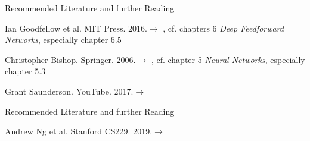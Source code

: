 \begin{frame}{Recommended Literature and further Reading}{}
	\footnotesize
	\begin{thebibliography}{2}
			{Ian Goodfellow et al. MIT Press. 2016.}{$\rightarrow$ \href{
				http://www.deeplearningbook.org/
			}{}, cf. chapters 6 \textit{Deep Feedforward Networks}, especially chapter 6.5}
	
			{Christopher Bishop. Springer. 2006.}{$\rightarrow$ \href{
				http://users.isr.ist.utl.pt/~wurmd/Livros/school/Bishop\%20-\%20Pattern\%20Recognition\%20And\%20Machine\%20Learning\%20-\%20Springer\%20\%202006.pdf
			}{}, cf. chapter 5 \textit{Neural Networks}, especially chapter 5.3}

			{Grant Saunderson. YouTube. 2017.}{$\rightarrow$ \href{
				https://www.youtube.com/watch?v=tIeHLnjs5U8
			}{}}

	\end{thebibliography}
\end{frame}

\begin{frame}{Recommended Literature and further Reading}{}
	\footnotesize
	\begin{thebibliography}{2}
			{Andrew Ng et al. Stanford CS229. 2019.}{$\rightarrow$ \href{
				http://cs229.stanford.edu/notes/backprop.py
			}{}}

	\end{thebibliography}
\end{frame}


\makethanks


